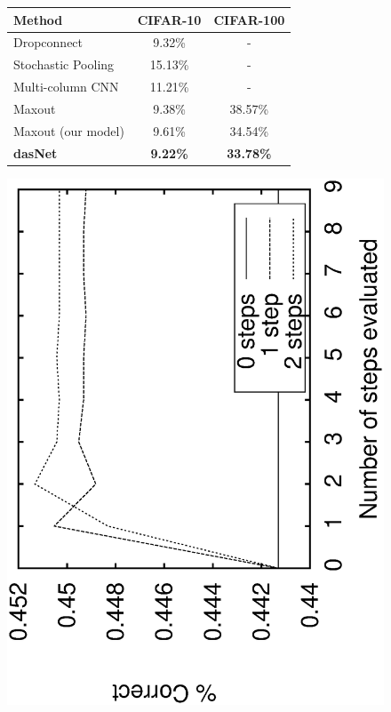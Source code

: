 \begin{figure}[t]
\begin{minipage}[b]{0.55\linewidth}
\begin{tabular}{l c c}
  \hline
  Method & {\footnotesize CIFAR-10} & {\footnotesize  CIFAR-100} \\
  \hline
  \hline
  Dropconnect~\cite{wan2013regularization}%
& 9.32\% & -\\
  \hline
  Stochastic Pooling~\cite{2013:zeiler_stochpool} & 15.13\% & - \\ 
  Multi-column CNN~\cite{ciresan2012cvpr} & 11.21\% & - \\
  Maxout~\cite{goodfellow2013maxout} & 9.38\% & 38.57\% \\
  Maxout (our model) & 9.61\% & 34.54\% \\
  \bf{dasNet} & \bf{9.22}\%  & \bf{33.78}\% \\ 
  \hline
\end{tabular}
\label{tab:cifar10}
\end{minipage}
\quad
\begin{minipage}[b]{0.4\linewidth}
\centering
\includegraphics[angle=-90,width=\linewidth]{1step2step.eps}

\end{minipage}
\end{figure}
